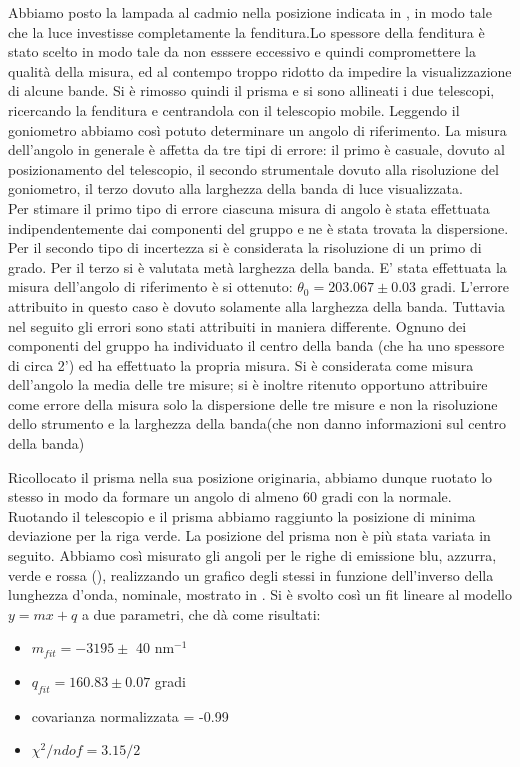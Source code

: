 Abbiamo posto la lampada al cadmio nella posizione indicata in , in modo tale che la luce investisse completamente la fenditura.Lo spessore della fenditura è stato scelto in modo tale da non esssere eccessivo e quindi compromettere la qualità della misura, ed al contempo troppo ridotto da impedire la visualizzazione di alcune bande. \newline
 Si è rimosso quindi il prisma e si sono allineati i due telescopi, ricercando la fenditura e centrandola con il telescopio mobile. Leggendo il goniometro abbiamo così potuto determinare un angolo di riferimento. \newline
  La misura dell'angolo in generale è affetta da tre tipi di errore: il primo è casuale, dovuto al posizionamento del telescopio, il secondo strumentale dovuto alla  risoluzione del goniometro, il terzo dovuto alla larghezza della banda di luce visualizzata. \\
Per stimare il primo tipo di errore ciascuna misura di angolo è stata effettuata indipendentemente dai componenti del gruppo e ne è stata trovata la dispersione. Per il secondo tipo di incertezza si è considerata la risoluzione di un primo di grado. Per il terzo si è valutata metà larghezza della banda. \newline
 E' stata effettuata la misura dell'angolo di riferimento è si ottenuto: $\theta_{0}=203.067 \pm 0.03$ gradi. L'errore attribuito in questo caso è dovuto solamente alla larghezza della banda. Tuttavia nel seguito gli errori sono stati attribuiti in maniera differente. Ognuno dei componenti del gruppo ha individuato il centro della banda (che ha uno spessore di circa 2') ed ha effettuato la propria misura. Si è  considerata come misura dell'angolo la media delle tre misure; si è inoltre ritenuto opportuno attribuire come errore della misura solo la dispersione delle tre misure e non la risoluzione dello strumento e la larghezza della banda(che non danno informazioni sul centro della banda)  \newline
 
Ricollocato il prisma nella sua posizione originaria, abbiamo dunque ruotato lo stesso in modo da formare un angolo di almeno 60 gradi con la normale. Ruotando il telescopio e il prisma abbiamo raggiunto la posizione di minima deviazione per la riga verde. La posizione del prisma non è più stata variata in seguito. Abbiamo così misurato gli angoli per le righe di emissione blu, azzurra, verde e rossa (), realizzando un grafico degli stessi in funzione dell'inverso della lunghezza d'onda, nominale, mostrato in . Si è svolto così un fit lineare al modello $y=mx+q$ a due parametri, che dà come risultati:	
\begin{itemize}
\item	$m_{fit}=-3195 \pm$ 40 nm$^{-1}$
\item	$q_{fit}=160.83 \pm 0.07$ gradi
\item	covarianza normalizzata = -0.99
\item	$\chi^{2}/ndof=3.15/2$
\end{itemize}

